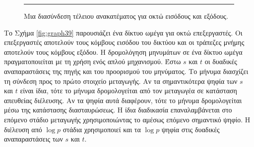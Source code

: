\documentclass[12pt,a4paper]{article} %
\begin{document}
\begin{figure}[H]
\centering
{}
\noindent\rule{\textwidth}{0.2pt}
\caption{Μια διασύνδεση τέλειου ανακατέματος
για οκτώ εισόδους και εξόδους.}
\label{fig:graph37}
\end{figure}
\vspace{0.3cm}

Το Σχήμα \ref{fig:graph39} παρουσιάζει ένα δίκτυο ωμέγα
για οκτώ επεξεργαστές. Οι επεξεργαστές αποτελούν τους κόμβους εισόδου 
του δικτύου και οι τράπεζες μνήμης αποτελούν τους κόμβους εξόδου. 
Η δρομολόγηση μηνυμάτων σε ένα δίκτυο ωμέγα πραγματοποιείται με τη χρήση 
ενός απλού μηχανισμού. Έστω $s$ και $t$ οι δυαδικές αναπαραστάσεις της 
πηγής και του προορισμού του μηνύματος. Το μήνυμα διασχίζει τη σύνδεση 
προς το πρώτο στοιχείο μεταγωγής. 
Αν τα σημαντικότερα ψηφία των $s$ και $t$ είναι ίδια, τότε το μήνυμα 
δρομολογείται από τον μεταγωγέα σε κατάσταση απευθείας διέλευσης. Αν τα 
ψηφία αυτά διαφέρουν, τότε το μήνυμα δρομολογείται μέσω της κατάστασης 
διασταυρώσεως. Η ίδια διαδικασία επαναλαμβάνεται στο επόμενο στάδιο 
μεταγωγής χρησιμοποιώντας το αμέσως επόμενο σημαντικό ψηφίο. Η διέλευση 
από $\log p$ στάδια χρησιμοποιεί και τα $\log p$ ψηφία στις δυαδικές 
αναπαραστάσεις των $s$ και $t$.
\end{document}
